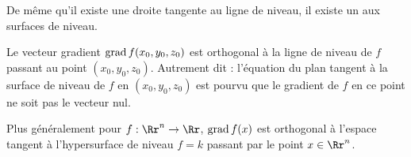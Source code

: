 \documentclass[12pt, class=report,crop=false]{standalone}
\begin{document}
De même qu'il existe une droite tangente au ligne de niveau, il existe un  aux surfaces de niveau.


\begin{proposition}
Le vecteur gradient $\operatorname{grad} f(x_0,y_0,z_0)$ est orthogonal à la ligne de niveau de $f$ passant au point $(x_0,y_0,z_0)$. Autrement dit :
l'équation du plan tangent à la surface de niveau de $f$ en $(x_0,y_0,z_0)$ est 
pourvu que le gradient de $f$ en ce point ne soit pas le vecteur nul.
\end{proposition}




Plus généralement pour $f : \Rr^n \to \Rr$, $\operatorname{grad} f (x)$ est orthogonal à l'espace tangent à
l'hypersurface de niveau $f=k$ passant par le point $x\in\Rr^n$.
\end{document}
